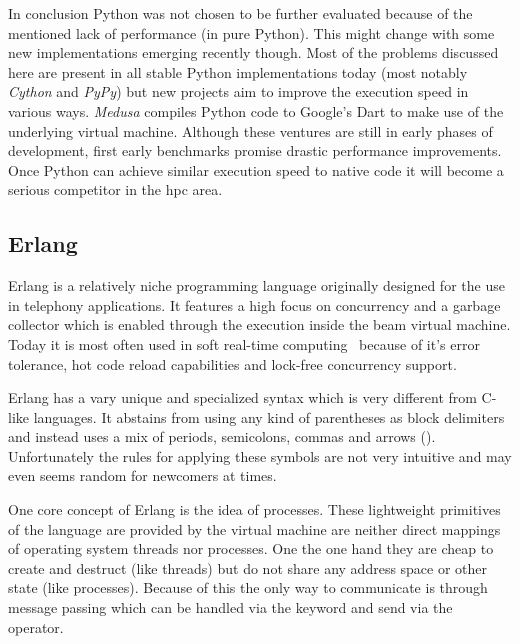 In conclusion Python was not chosen to be further evaluated because of the mentioned lack of performance (in pure Python). This might change with some new implementations emerging recently though. Most of the problems discussed here are present in all stable Python implementations today (most notably \textit{Cython} and \textit{PyPy}) but new projects aim to improve the execution speed in various ways. \textit{Medusa} compiles Python code to Google's Dart to make use of the underlying virtual machine. Although these ventures are still in early phases of development, first early benchmarks promise drastic performance improvements. Once Python can achieve similar execution speed to native code it will become a serious competitor in the \gls{hpc} area.

\subsection*{Erlang}
\label{subsec:State_of_the_art::Candidates::Erlang}

Erlang is a relatively niche programming language originally designed for the use in telephony applications. It features a high focus on concurrency and a garbage collector which is enabled through the execution inside the \gls{beam} virtual machine. Today it is most often used in soft real-time computing~ because of it's error tolerance, hot code reload capabilities and lock-free concurrency support.~\cite{intro_erlang}

Erlang has a vary unique and specialized syntax which is very different from C-like languages. It abstains from using any kind of parentheses as block delimiters and instead uses a mix of periods, semicolons, commas and arrows (\mdinline{->}). Unfortunately the rules for applying these symbols are not very intuitive and may even seems random for newcomers at times.

One core concept of Erlang is the idea of processes. These lightweight primitives of the language are provided by the virtual machine are neither direct mappings of operating system threads nor processes. One the one hand they are cheap to create and destruct (like threads) but do not share any address space or other state (like processes). Because of this the only way to communicate is through message passing which can be handled via the  keyword and send via the \mdinline{!} operator.~\cite{erlang_phd, intro_erlang}
\\


